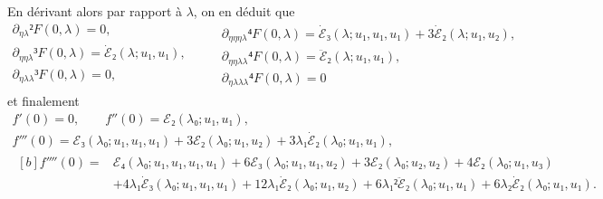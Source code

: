 \documentclass[12pt, final]{scrartcl}
\theoremstyle{definition}
\begin{document}
En dérivant alors par rapport à \(λ\), on en déduit que\\
\begin{equation*}
  \begin{gathered}
    ∂_{ηλ}² F(0, λ) = 0,\\
    ∂_{ηηλ}³ F(0, λ) = \dot{ℰ}₂(λ; u₁, u₁),\\
    ∂_{ηλλ}³ F(0, λ) = 0,\\
  \end{gathered}
  \qquad
  \begin{gathered}
    ∂_{ηηηλ}⁴ F(0, λ) = \dot{ℰ}₃(λ; u₁, u₁, u₁) + 3\dot{ℰ}₂(λ; u₁, u₂),\\
    ∂_{ηηλλ}⁴ F(0, λ) = \ddot{ℰ}₂(λ; u₁, u₁),\\
    ∂_{ηλλλ}⁴ F(0, λ) = 0
  \end{gathered}
\end{equation*}
et finalement
\begin{gather*}
    f'(0) = 0, \qquad f''(0) = ℰ₂(λ₀; u₁, u₁),\\
    f'''(0) =ℰ₃(λ₀; u₁, u₁, u₁) + 3ℰ₂(λ₀; u₁, u₂) + 3λ₁ \dot{ℰ}₂(λ₀; u₁, u₁),\\
    \begin{aligned}[b]
      f''''(0) ={}
      & ℰ₄(λ₀; u₁, u₁, u₁, u₁) + 6ℰ₃(λ₀; u₁, u₁, u₂) + 3ℰ₂(λ₀; u₂, u₂) + 4ℰ₂(λ₀; u₁, u₃)\\
      & + 4 λ₁ \dot{ℰ}₃(λ₀; u₁, u₁, u₁) + 12 λ₁ \dot{ℰ}₂(λ₀; u₁, u₂) + 6λ₁² \ddot{ℰ}₂(λ₀; u₁, u₁) + 6λ₂ \dot{ℰ}₂(λ₀; u₁, u₁).
    \end{aligned}
\end{gather*}
\end{document}
